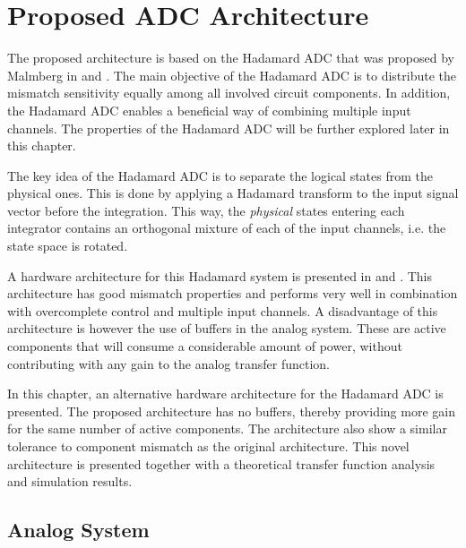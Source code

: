 
\chapter{Proposed ADC Architecture}
\label{sec:HadamardADC}

The proposed architecture is based on the Hadamard ADC that was proposed by Malmberg in \cite{malmberg_thesis} and \cite{malmberg_talk}. The main objective of the Hadamard ADC is to distribute the mismatch sensitivity equally among all involved circuit components. In addition, the Hadamard ADC enables a beneficial way of combining multiple input channels. The properties of the Hadamard ADC will be further explored later in this chapter.

The key idea of the Hadamard ADC is to separate the logical states from the physical ones. This is done by applying a Hadamard transform to the input signal vector before the integration. This way, the \textit{physical} states entering each integrator contains an orthogonal mixture of each of the input channels, i.e. the state space is rotated.

A hardware architecture for this Hadamard system is presented in \cite{malmberg_thesis} and \cite{malmberg_talk}. This architecture has good mismatch properties and performs very well in combination with overcomplete control and multiple input channels. A disadvantage of this architecture is however the use of buffers in the analog system. These are active components that will consume a considerable amount of power, without contributing with any gain to the analog transfer function.

In this chapter, an alternative hardware architecture for the Hadamard ADC is presented. The proposed architecture has no buffers, thereby providing more gain for the same number of active components. The architecture also show a similar tolerance to component mismatch as the original architecture. This novel architecture is presented together with a theoretical transfer function analysis and simulation results.

\section{Analog System}
